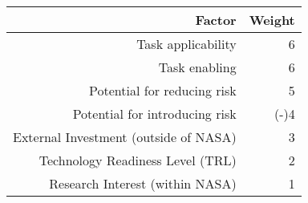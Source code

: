 \begin{tabular}{*{2}{r}}
    \toprule
    Factor                                & Weight \\
    \midrule
    Task applicability                    & 6      \\
    Task enabling                         & 6      \\
    Potential for reducing risk           & 5      \\
    Potential for introducing risk        & (-)4   \\
    External Investment (outside of NASA) & 3      \\
    Technology Readiness Level (TRL)      & 2      \\
    Research Interest (within NASA)       & 1      \\
    \bottomrule
\end{tabular}
